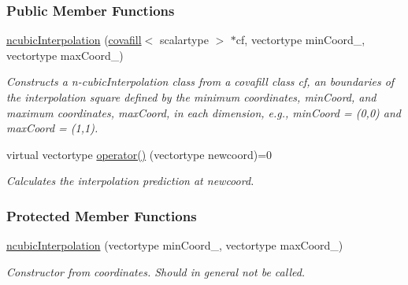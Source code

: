 \subsubsection*{Public Member Functions}
\begin{DoxyCompactItemize}
\item 
\hypertarget{classncubicInterpolation_aefd7ad3e2a5582ac0c4556b71c1b0cc9}{}\hyperlink{classncubicInterpolation_aefd7ad3e2a5582ac0c4556b71c1b0cc9}{ncubic\+Interpolation} (\hyperlink{classcovafill}{covafill}$<$ scalartype $>$ $\ast$cf, vectortype min\+Coord\+\_\+, vectortype max\+Coord\+\_\+)\label{classncubicInterpolation_aefd7ad3e2a5582ac0c4556b71c1b0cc9}

\begin{DoxyCompactList}\small\item\em Constructs a n-\/cubic\+Interpolation class from a covafill class {\itshape cf}, an boundaries of the interpolation square defined by the minimum coordinates, {\itshape min\+Coord}, and maximum coordinates, {\itshape max\+Coord}, in each dimension, e.\+g., min\+Coord = (0,0) and max\+Coord = (1,1). \end{DoxyCompactList}\item 
\hypertarget{classncubicInterpolation_a83cfa933656a532951dcdd97ef7f50f1}{}virtual vectortype \hyperlink{classncubicInterpolation_a83cfa933656a532951dcdd97ef7f50f1}{operator()} (vectortype newcoord)=0\label{classncubicInterpolation_a83cfa933656a532951dcdd97ef7f50f1}

\begin{DoxyCompactList}\small\item\em Calculates the interpolation prediction at {\itshape newcoord}. \end{DoxyCompactList}\end{DoxyCompactItemize}
\subsubsection*{Protected Member Functions}
\begin{DoxyCompactItemize}
\item 
\hypertarget{classncubicInterpolation_adf4741f9535abf6ff6e232b0aa818b46}{}\hyperlink{classncubicInterpolation_adf4741f9535abf6ff6e232b0aa818b46}{ncubic\+Interpolation} (vectortype min\+Coord\+\_\+, vectortype max\+Coord\+\_\+)\label{classncubicInterpolation_adf4741f9535abf6ff6e232b0aa818b46}

\begin{DoxyCompactList}\small\item\em Constructor from coordinates. Should in general not be called. \end{DoxyCompactList}\end{DoxyCompactItemize}
